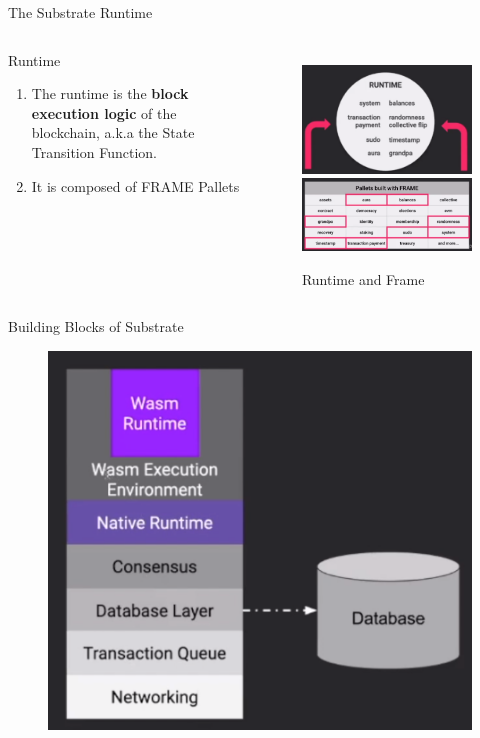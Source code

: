 \documentclass[UTF8]{beamer}
\begin{document}
	\begin{frame}{The Substrate Runtime}
		\begin{columns}
			\begin{block}{Runtime}
				\begin{enumerate}
					\item The runtime is the \textbf{block execution logic} of the blockchain, a.k.a the State Transition Function.
					\item It is composed of FRAME Pallets
				\end{enumerate}
			\end{block}
			\bigskip
			\bigskip
			\bigskip
			\bigskip
			\begin{figure}
				\centering
				\includegraphics[width=6cm]{figure/Runtime}
				\centering
				\includegraphics[width=6cm]{figure/Runtime2}
				\caption{Runtime and Frame}
			\end{figure}
		\end{columns}
	\end{frame}

	\begin{frame}{Building Blocks of Substrate}
		\begin{figure}
			\centering
			\includegraphics[width=0.7\linewidth]{"figure/Building Blocks of substrate"}
			\caption{}
			\label{fig:building-blocks-of-substrate}
		\end{figure}
	\end{frame}
\end{document}
